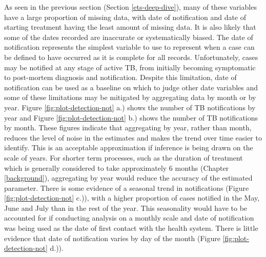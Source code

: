 \documentclass[11pt,twoside]{bristolthesis}
\begin{document}
  As seen in the previous section (Section \ref{ets-deep-dive}), many of these variables have a large proportion of missing data, with date of notification and date of starting treatment having the least amount of missing data. It is also likely that some of the dates recorded are inaccurate or systematically biased. The date of notification represents the simplest variable to use to represent when a case can be defined to have occurred as it is complete for all records. Unfortunately, cases may be notified at any stage of active TB, from initially becoming symptomatic to post-mortem diagnosis and notification. Despite this limitation, date of notification can be used as a baseline on which to judge other date variables and some of these limitations may be mitigated by aggregating data by month or by year. Figure \ref{fig:plot-detection-not} a.) shows the number of TB notifications by year and Figure \ref{fig:plot-detection-not} b.) shows the number of TB notifications by month. These figures indicate that aggregating by year, rather than month, reduces the level of noise in the estimates and makes the trend over time easier to identify. This is an acceptable approximation if inference is being drawn on the scale of years. For shorter term processes, such as the duration of treatment which is generally considered to take approximately 6 months (Chapter \ref{background}), aggregating by year would reduce the accuracy of the estimated parameter. There is some evidence of a seasonal trend in notifications (Figure \ref{fig:plot-detection-not} c.)), with a higher proportion of cases notified in the May, June and July than in the rest of the year. This seasonality would have to be accounted for if conducting analysis on a monthly scale and date of notification was being used as the date of first contact with the health system. There is little evidence that date of notification varies by day of the month (Figure \ref{fig:plot-detection-not} d.)).
\end{document}
